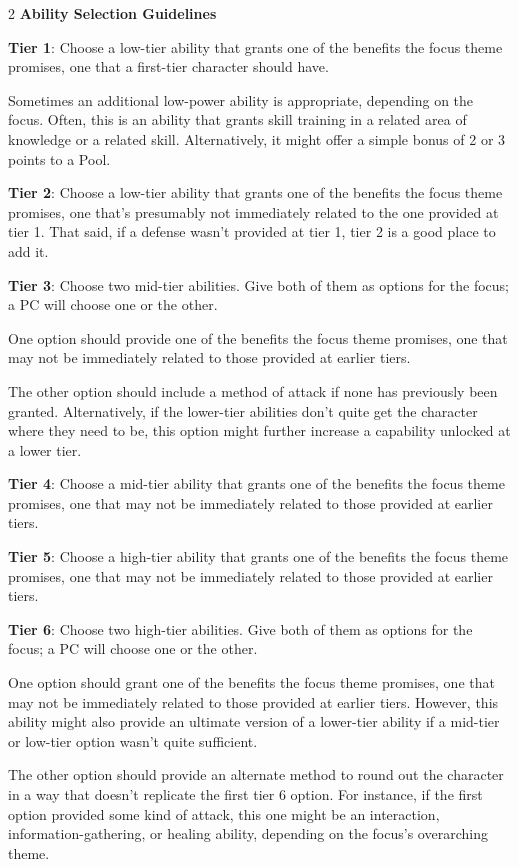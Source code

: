 \begin{multicols}{2}
\textbf{Ability Selection Guidelines}

\textbf{Tier 1}: Choose a low-tier ability that grants one of the benefits the focus theme promises, one that a first-tier character should have.

Sometimes an additional low-power ability is appropriate, depending on the focus. Often, this is an ability that grants skill training in a related area of knowledge or a related skill. Alternatively, it might offer a simple bonus of 2 or 3 points to a Pool.

\textbf{Tier 2}: Choose a low-tier ability that grants one of the benefits the focus theme promises, one that’s presumably not immediately related to the one provided at tier 1. That said, if a defense wasn’t provided at tier 1, tier 2 is a good place to add it.

\textbf{Tier 3}: Choose two mid-tier abilities. Give both of them as options for the focus; a PC will choose one or the other.

One option should provide one of the benefits the focus theme promises, one that may not be immediately related to those provided at earlier tiers.

The other option should include a method of attack if none has previously been granted. Alternatively, if the lower-tier abilities don’t quite get the character where they need to be, this option might further increase a capability unlocked at a lower tier.

\textbf{Tier 4}: Choose a mid-tier ability that grants one of the benefits the focus theme promises, one that may not be immediately related to those provided at earlier tiers. 

\textbf{Tier 5}: Choose a high-tier ability that grants one of the benefits the focus theme promises, one that may not be immediately related to those provided at earlier tiers.

\textbf{Tier 6}: Choose two high-tier abilities. Give both of them as options for the focus; a PC will choose one or the other.

One option should grant one of the benefits the focus theme promises, one that may not be immediately related to those provided at earlier tiers. However, this ability might also provide an ultimate version of a lower-tier ability if a mid-tier or low-tier option wasn’t quite sufficient.

The other option should provide an alternate method to round out the character in a way that doesn’t replicate the first tier 6 option. For instance, if the first option provided some kind of attack, this one might be an interaction, information-gathering, or healing ability, depending on the focus’s overarching theme.


\end{multicols}
